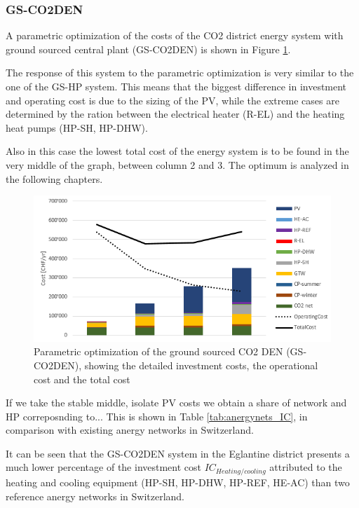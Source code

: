 \documentclass{article}
\begin{document}
\subsubsection{GS-CO2DEN}
A parametric optimization of the costs of the CO2 district energy system with ground sourced central plant (GS-CO2DEN) is shown in Figure \ref{fig:V_CO2_G_PO}.

The response of this system to the parametric optimization is very similar to the one of the GS-HP system. This means that the biggest difference in investment and operating cost is due to the sizing of the PV, while the extreme cases are determined by the ration between the electrical heater (R-EL) and the heating heat pumps (HP-SH, HP-DHW).

Also in this case the lowest total cost of the energy system is to be found in the very middle of the graph, between column 2 and 3. The optimum is analyzed in the following chapters.

\begin{figure}[htp]
	\centering
	\includegraphics[width=1\textwidth]{V_CO2_G_PO1.png}
	\caption{Parametric optimization of the ground sourced CO2 DEN (GS-CO2DEN), showing the detailed investment costs, the operational cost and the total cost}
	\label{fig:V_CO2_G_PO}
\end{figure}

If we take the stable middle, isolate PV costs we obtain a share of network and HP correposnding to... This is shown in  Table \ref{tab:anergynets_IC}, in comparison with existing anergy networks in Switzerland.



It can be seen that the GS-CO2DEN system in the Eglantine district presents a much lower percentage of the investment cost  $IC_{Heating/cooling}$ attributed to the heating and cooling equipment (HP-SH, HP-DHW, HP-REF, HE-AC) than two reference anergy networks in Switzerland. 
\end{document}
